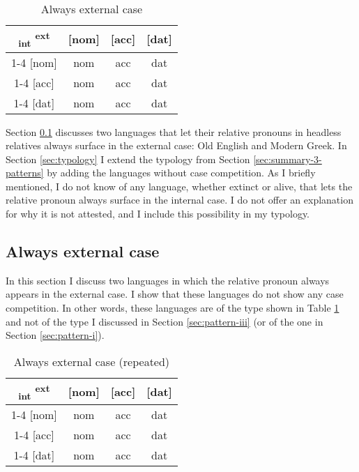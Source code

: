 \begin{table}[H]
  \center
  \caption{Always external case}
  \begin{tabular}{c|c|c|c}
    \toprule
   \textsubscript{\ac{int}} \textsuperscript{\ac{ext}}
          & [\ac{nom}]
          & [\ac{acc}]
          & [\ac{dat}]
          \\ \cmidrule{1-4}
      [\ac{nom}]
          & \ac{nom}
          & \ac{acc}
          & \ac{dat}
          \\ \cmidrule{1-4}
      [\ac{acc}]
          & \ac{nom}
          & \ac{acc}
          & \ac{dat}
          \\ \cmidrule{1-4}
      [\ac{dat}]
          & \ac{nom}
          & \ac{acc}
          & \ac{dat}
          \\
    \bottomrule
  \end{tabular}
  \label{tbl:no-case-competition-ext}
\end{table}

Section \ref{sec:always-ext} discusses two languages that let their relative pronouns in headless relatives always surface in the external case: Old English and Modern Greek. In Section \ref{sec:typology} I extend the typology from Section \ref{sec:summary-3-patterns} by adding the languages without case competition. As I briefly mentioned, I do not know of any language, whether extinct or alive, that lets the relative pronoun always surface in the internal case. I do not offer an explanation for why it is not attested, and I include this possibility in my typology.

\subsection{Always external case}\label{sec:always-ext}

In this section I discuss two languages in which the relative pronoun always appears in the external case. I show that these languages do not show any case competition. In other words, these languages are of the type shown in Table \ref{tbl:no-case-competition-ext} and not of the type I discussed in Section \ref{sec:pattern-iii} (or of the one in Section \ref{sec:pattern-i}).

\begin{table}[H]
  \center
  \caption{Always external case (repeated)}
  \begin{tabular}{c|c|c|c}
    \toprule
   \textsubscript{\ac{int}} \textsuperscript{\ac{ext}}
          & [\ac{nom}]
          & [\ac{acc}]
          & [\ac{dat}]
          \\ \cmidrule{1-4}
      [\ac{nom}]
          & \ac{nom}
          & \ac{acc}
          & \ac{dat}
          \\ \cmidrule{1-4}
      [\ac{acc}]
          & \ac{nom}
          & \ac{acc}
          & \ac{dat}
          \\ \cmidrule{1-4}
      [\ac{dat}]
          & \ac{nom}
          & \ac{acc}
          & \ac{dat}
          \\
    \bottomrule
  \end{tabular}
  \label{tbl:no-case-competition-ext-repeated}
\end{table}

